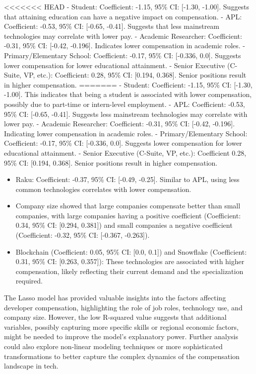 \documentclass[
  12pt,
]{article}
\providecommand{\tightlist}{%
  \setlength{\itemsep}{0pt}\setlength{\parskip}{0pt}}
\begin{document}
\textless\textless\textless\textless\textless\textless\textless{} HEAD -
Student: Coefficient: -1.15, 95\% CI: {[}-1.30, -1.00{]}. Suggests that
attaining education can have a negative impact on compensation. - APL:
Coefficient: -0.53, 95\% CI: {[}-0.65, -0.41{]}. Suggests that less
mainstream technologies may correlate with lower pay. - Academic
Researcher: Coefficient: -0.31, 95\% CI: {[}-0.42, -0.196{]}. Indicates
lower compensation in academic roles. - Primary/Elementary School:
Coefficient: -0.17, 95\% CI: {[}-0.336, 0.0{]}. Suggests lower
compensation for lower educational attainment. - Senior Executive
(C-Suite, VP, etc.): Coefficient: 0.28, 95\% CI: {[}0.194, 0.368{]}.
Senior positions result in higher compensation. ======= - Student:
Coefficient: -1.15, 95\% CI: {[}-1.30, -1.00{]}. This indicates that
being a student is associated with lower compensation, possibly due to
part-time or intern-level employment. - APL: Coefficient: -0.53, 95\%
CI: {[}-0.65, -0.41{]}. Suggests less mainstream technologies may
correlate with lower pay. - Academic Researcher: Coefficient: -0.31,
95\% CI: {[}-0.42, -0.196{]}. Indicating lower compensation in academic
roles. - Primary/Elementary School: Coefficient: -0.17, 95\% CI:
{[}-0.336, 0.0{]}. Suggests lower compensation for lower educational
attainment. - Senior Executive (C-Suite, VP, etc.): Coefficient 0.28,
95\% CI: {[}0.194, 0.368{]}. Senior positions result in higher
compensation.

\begin{itemize}
\tightlist
\item
  Raku: Coefficient: -0.37, 95\% CI: {[}-0.49, -0.25{]}. Similar to APL,
  using less common technologies correlates with lower compensation.
\item
  Company size showed that large companies compensate better than small
  companies, with large companies having a positive coefficient
  (Coefficient: 0.34, 95\% CI: {[}0.294, 0.381{]}) and small companies a
  negative coefficient (Coefficient: -0.32, 95\% CI: {[}-0.367,
  -0.263{]}).
\item
  Blockchain (Coefficient: 0.05, 95\% CI: {[}0.0, 0.1{]}) and Snowflake
  (Coefficient: 0.31, 95\% CI: {[}0.263, 0.357{]}): These technologies
  are associated with higher compensation, likely reflecting their
  current demand and the specialization required.
\end{itemize}

The Lasso model has provided valuable insights into the factors
affecting developer compensation, highlighting the role of job roles,
technology use, and company size. However, the low R-squared value
suggests that additional variables, possibly capturing more specific
skills or regional economic factors, might be needed to improve the
model's explanatory power. Further analysis could also explore
non-linear modeling techniques or more sophisticated transformations to
better capture the complex dynamics of the compensation landscape in
tech.
\end{document}
